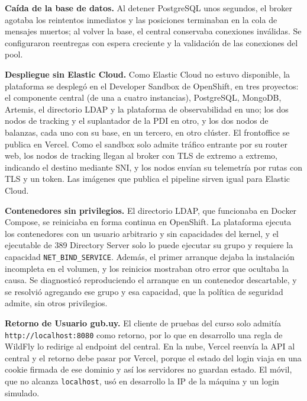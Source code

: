 \textbf{Caída de la base de datos.} Al detener PostgreSQL unos segundos, el broker agotaba los reintentos inmediatos y las posiciones terminaban en la cola de mensajes muertos; al volver la base, el central conservaba conexiones inválidas. Se configuraron reentregas con espera creciente y la validación de las conexiones del pool.

\textbf{Despliegue sin Elastic Cloud.} Como Elastic Cloud no estuvo disponible, la plataforma se desplegó en el Developer Sandbox de OpenShift, en tres proyectos: el componente central (de una a cuatro instancias), PostgreSQL, MongoDB, Artemis, el directorio LDAP y la plataforma de observabilidad en uno; los dos nodos de tracking y el suplantador de la PDI en otro, y los dos nodos de balanzas, cada uno con su base, en un tercero, en otro clúster. El frontoffice se publica en Vercel. Como el sandbox solo admite tráfico entrante por su router web, los nodos de tracking llegan al broker con TLS de extremo a extremo, indicando el destino mediante SNI, y los nodos envían su telemetría por rutas con TLS y un token. Las imágenes que publica el pipeline sirven igual para Elastic Cloud.

\textbf{Contenedores sin privilegios.} El directorio LDAP, que funcionaba en Docker Compose, se reiniciaba en forma continua en OpenShift. La plataforma ejecuta los contenedores con un usuario arbitrario y sin capacidades del kernel, y el ejecutable de 389 Directory Server solo lo puede ejecutar su grupo y requiere la capacidad \texttt{NET\_BIND\_SERVICE}. Además, el primer arranque dejaba la instalación incompleta en el volumen, y los reinicios mostraban otro error que ocultaba la causa. Se diagnosticó reproduciendo el arranque en un contenedor descartable, y se resolvió agregando ese grupo y esa capacidad, que la política de seguridad admite, sin otros privilegios.

\textbf{Retorno de Usuario gub.uy.} El cliente de pruebas del curso solo admitía \texttt{http://localhost:8080} como retorno, por lo que en desarrollo una regla de WildFly lo redirige al endpoint del central. En la nube, Vercel reenvía la API al central y el retorno debe pasar por Vercel, porque el estado del login viaja en una cookie firmada de ese dominio y así los servidores no guardan estado. El móvil, que no alcanza \texttt{localhost}, usó en desarrollo la IP de la máquina y un login simulado.
